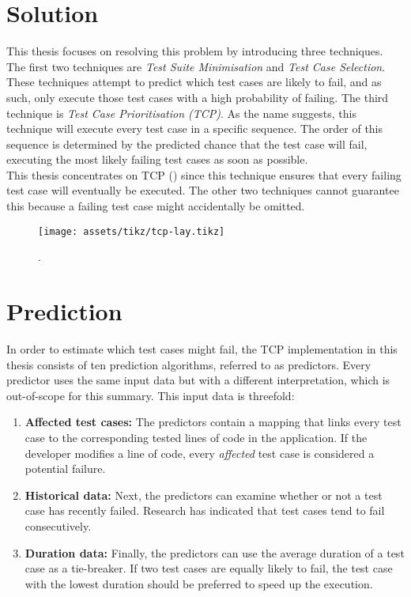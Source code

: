 \section*{Solution}
This thesis focuses on resolving this problem by introducing three techniques. The first two techniques are \emph{Test Suite Minimisation} and \emph{Test Case Selection}. These techniques attempt to predict which test cases are likely to fail, and as such, only execute those test cases with a high probability of failing. The third technique is \emph{Test Case Prioritisation (TCP)}. As the name suggests, this technique will execute every test case in a specific sequence. The order of this sequence is determined by the predicted chance that the test case will fail, executing the most likely failing test cases as soon as possible.\\ This thesis concentrates on TCP () since this technique ensures that every failing test case will eventually be executed. The other two techniques cannot guarantee this because a failing test case might accidentally be omitted. 

\begin{figure}[t!]
	\centering
	\texttt{[image: assets/tikz/tcp-lay.tikz]}
	\caption{\tcp{}.}
	\label{fig:tcp-lay}
\end{figure}

\section*{Prediction}
In order to estimate which test cases might fail, the TCP implementation in this thesis consists of ten prediction algorithms, referred to as predictors. Every predictor uses the same input data but with a different interpretation, which is out-of-scope for this summary. This input data is threefold:
\begin{enumerate}
	\item \textbf{Affected test cases:} The predictors contain a mapping that links every test case to the corresponding tested lines of code in the application. If the developer modifies a line of code, every \emph{affected} test case is considered a potential failure.
	
	\item \textbf{Historical data:} Next, the predictors can examine whether or not a test case has recently failed. Research has indicated that test cases tend to fail consecutively.
	
	\item \textbf{Duration data:} Finally, the predictors can use the average duration of a test case as a tie-breaker. If two test cases are equally likely to fail, the test case with the lowest duration should be preferred to speed up the execution.
\end{enumerate}

